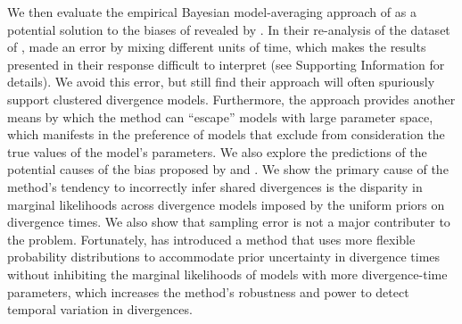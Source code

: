 We then evaluate the empirical Bayesian model-averaging approach of
\citet{Hickerson2013} as a potential solution to the biases of \msb revealed by
\citet{Oaks2012}.
In their re-analysis of the dataset of \citet{Oaks2012}, \citet{Hickerson2013}
made an error by mixing different units of time, which makes the results
presented in their response difficult to interpret (see Supporting Information
for details).
We avoid this error, but still find their approach will often spuriously
support clustered divergence models.
Furthermore, the approach provides another means by which the method can
``escape'' models with large parameter space, which manifests in the preference
of models that exclude from consideration the true values of the model's
parameters.
We also explore the predictions of the potential causes of the bias proposed by
\citet{Oaks2012} and \citet{Hickerson2013}.
We show the primary cause of the method's tendency to incorrectly infer shared
divergences is the disparity in marginal likelihoods across divergence models
imposed by the uniform priors on divergence times.
We also show that sampling error is not a major contributer to the problem.
Fortunately, \citet{Oaks2014dpp} has introduced a method that uses more
flexible probability distributions to accommodate prior uncertainty in
divergence times without inhibiting the marginal likelihoods of models with
more divergence-time parameters, which increases the method's robustness and
power to detect temporal variation in divergences.


